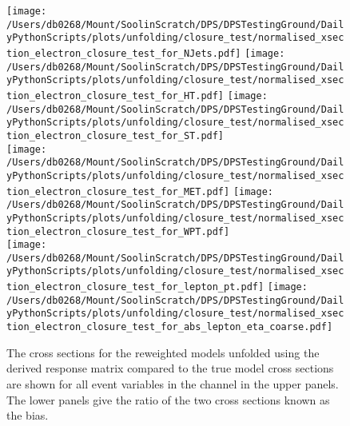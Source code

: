 \begin{figure*}[htpb]
	\centering
	\texttt{[image: /Users/db0268/Mount/SoolinScratch/DPS/DPSTestingGround/DailyPythonScripts/plots/unfolding/closure\_test/normalised\_xsection\_electron\_closure\_test\_for\_NJets.pdf]}
	\texttt{[image: /Users/db0268/Mount/SoolinScratch/DPS/DPSTestingGround/DailyPythonScripts/plots/unfolding/closure\_test/normalised\_xsection\_electron\_closure\_test\_for\_HT.pdf]}
	\texttt{[image: /Users/db0268/Mount/SoolinScratch/DPS/DPSTestingGround/DailyPythonScripts/plots/unfolding/closure\_test/normalised\_xsection\_electron\_closure\_test\_for\_ST.pdf]} \\
	\texttt{[image: /Users/db0268/Mount/SoolinScratch/DPS/DPSTestingGround/DailyPythonScripts/plots/unfolding/closure\_test/normalised\_xsection\_electron\_closure\_test\_for\_MET.pdf]}
	\texttt{[image: /Users/db0268/Mount/SoolinScratch/DPS/DPSTestingGround/DailyPythonScripts/plots/unfolding/closure\_test/normalised\_xsection\_electron\_closure\_test\_for\_WPT.pdf]} \\
	\texttt{[image: /Users/db0268/Mount/SoolinScratch/DPS/DPSTestingGround/DailyPythonScripts/plots/unfolding/closure\_test/normalised\_xsection\_electron\_closure\_test\_for\_lepton\_pt.pdf]}
	\texttt{[image: /Users/db0268/Mount/SoolinScratch/DPS/DPSTestingGround/DailyPythonScripts/plots/unfolding/closure\_test/normalised\_xsection\_electron\_closure\_test\_for\_abs\_lepton\_eta\_coarse.pdf]}
	\caption[The cross sections for the reweighted models unfolded using the \powhegpythia{} derived response matrix compared to the true model cross sections are shown for all event variables in the \eJets{} channel in the upper panels. The lower panels give the ratio of the two cross sections known as the bias.]{The cross sections for the reweighted models unfolded using the \powhegpythia{} derived response matrix compared to the true model cross sections are shown for all event variables in the \eJets{} channel in the upper panels. The lower panels give the ratio of the two cross sections known as the bias.}
	\label{fig:ClosureBiase1}
\end{figure*}
